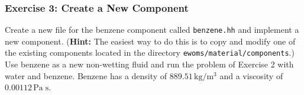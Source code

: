 \subsubsection{Exercise 3: Create a New Component}

Create a new file for the benzene component called \texttt{benzene.hh}
and implement a new component. (\textbf{Hint:} The easiest way to do
this is to copy and modify one of the existing components located in
the directory \texttt{ewoms/material/components}.) Use benzene as a
new non-wetting fluid and run the problem of Exercise 2 with water and
benzene. Benzene has a density of $889.51 \, \text{kg} / \text{m}^3$
and a viscosity of $0.00112 \, \text{Pa} \; \text{s}$.

\clearpage \newpage

